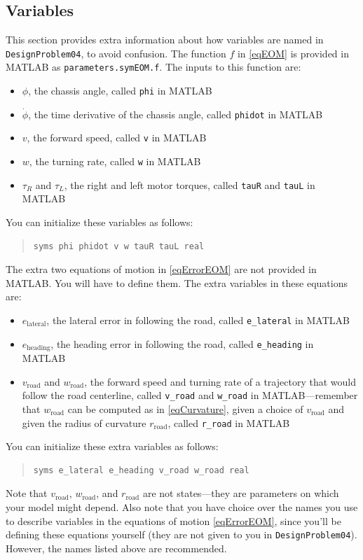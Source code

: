 \documentclass[conf]{new-aiaa}
\begin{document}
\subsection{Variables}

This section provides extra information about how variables are named in \lstinline|DesignProblem04|, to avoid confusion. The function $f$ in \eqref{eqEOM} is provided in MATLAB as \lstinline|parameters.symEOM.f|. The inputs to this function are:
\begin{itemize}
\item $\phi$, the chassis angle, called \lstinline|phi| in MATLAB
\item $\dot{\phi}$, the time derivative of the chassis angle, called \lstinline|phidot| in MATLAB
\item $v$, the forward speed, called \lstinline|v| in MATLAB
\item $w$, the turning rate, called \lstinline|w| in MATLAB
\item $\tau_{R}$ and $\tau_{L}$, the right and left motor torques, called \lstinline|tauR| and \lstinline|tauL| in MATLAB
\end{itemize}
You can initialize these variables as follows:
\begin{quote}
\begin{lstlisting}
syms phi phidot v w tauR tauL real
\end{lstlisting}
\end{quote}
The extra two equations of motion in \eqref{eqErrorEOM} are not provided in MATLAB. You will have to define them. The extra variables in these equations are:
\begin{itemize}
\item $e_\text{lateral}$, the lateral error in following the road, called \lstinline|e_lateral| in MATLAB
\item $e_\text{heading}$, the heading error in following the road, called \lstinline|e_heading| in MATLAB
\item $v_\text{road}$ and $w_\text{road}$, the forward speed and turning rate of a trajectory that would follow the road centerline, called \lstinline|v_road| and \lstinline|w_road| in MATLAB---remember that $w_\text{road}$ can be computed as in \eqref{eqCurvature}, given a choice of $v_\text{road}$ and given the radius of curvature $r_\text{road}$, called \lstinline|r_road| in MATLAB
\end{itemize}
You can initialize these extra variables as follows:
\begin{quote}
\begin{lstlisting}
syms e_lateral e_heading v_road w_road real
\end{lstlisting}
\end{quote}
Note that $v_\text{road}$, $w_\text{road}$, and $r_\text{road}$ are not states---they are parameters on which your model might depend. Also note that you have choice over the names you use to describe variables in the equations of motion \eqref{eqErrorEOM}, since you'll be defining these equations yourself (they are not given to you in \lstinline|DesignProblem04|). However, the names listed above are recommended.
\end{document}
